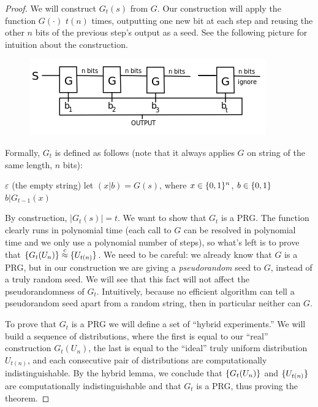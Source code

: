 \documentclass[11pt]{article}
\begin{document}
\begin{proof}
  We will construct $G_t(s)$ from $G$.  Our construction will apply
  the function $G(\cdot)$ $t(n)$ times, outputting one new bit at each
  step and reusing the other $n$ bits of the previous step's output as
  a seed.  See the following picture for intuition about the
  construction.

  \begin{figure}[h!]
    \centering
    \includegraphics[]{./prg.jpg}
  \end{figure}

  Formally, $G_t$ is defined as follows (note that it always applies
  $G$ on string of the same length, $n$ bits):
  \begin{algorithm}[h]
    \caption{$G_t(s)$}
    \begin{algorithmic}
       \RETURN $\varepsilon$ (the empty string)
      \ELSE \STATE let $(x|b)=G(s)$, where $x \in \{0,1\}^{n}$, $b \in \{0,1\}$
      \RETURN $b|G_{t-1}(x)$
      \ENDIF
    \end{algorithmic}
  \end{algorithm}

  By construction, $|G_t(s)|=t$.  We want to show that $G_t$ is a PRG.
  The function clearly runs in polynomial time (each call to $G$ can
  be resolved in polynomial time and we only use a polynomial number
  of steps), so what's left is to prove that $\{G_t(U_n)\} \stackrel{c}{\approx}
  \{U_{t(n)}\}$.  We need to be careful: we already know that $G$ is
  a PRG, but in our construction we are giving a \emph{pseudorandom}
  seed to $G$, instead of a truly random seed.  We will see that this
  fact will not affect the pseudorandomness of $G_t$.  Intuitively,
  because no efficient algorithm can tell a pseudorandom seed apart
  from a random string, then in particular neither can $G$.

  To prove that $G_t$ is a PRG we will define a set of ``hybrid
  experiments.''  We will build a sequence of distributions, where the
  first is equal to our ``real'' construction $G_t(U_{n})$, the last
  is equal to the ``ideal'' truly uniform distribution $U_{t(n)}$, and
  each consecutive pair of distributions are computationally
  indistinguishable.  By the hybrid lemma, we conclude that
  $\{G_t(U_{n})\}$ and $\{U_{t(n)}\}$ are computationally
  indistinguishable and that $G_t$ is a PRG, thus proving the theorem.


\end{proof}
\end{document}
